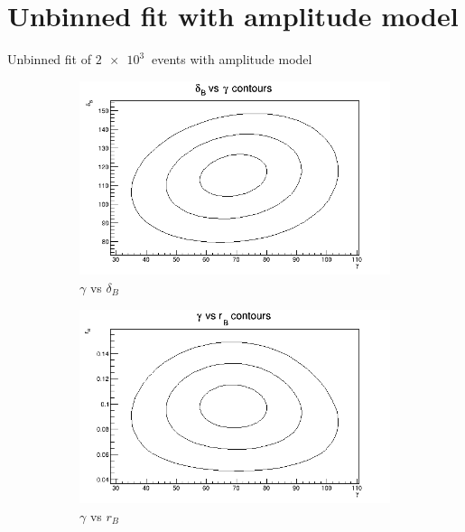 \documentclass{beamer}
\begin{document}
\section{Unbinned fit with amplitude model}
\begin{frame}{Unbinned fit of $\SI{2e3}{}$ events with amplitude model}
  \begin{figure}
    \centering
    \vspace{-0.2cm}
    \begin{subfigure}{0.46\textwidth}
      \includegraphics[width = 1.0\textwidth]{Contour_dB_vs_gamma_1K.png}
      \caption{$\gamma$ vs $\delta_B$}
    \end{subfigure}%
    \begin{subfigure}{0.46\textwidth}
      \includegraphics[width = 1.0\textwidth]{Contour_gamma_vs_rB_1K.png}
      \caption{$\gamma$ vs $r_B$}
    \end{subfigure}
    \begin{subfigure}{0.46\textwidth}

\end{subfigure}
\end{figure}
\end{frame}
\end{document}
